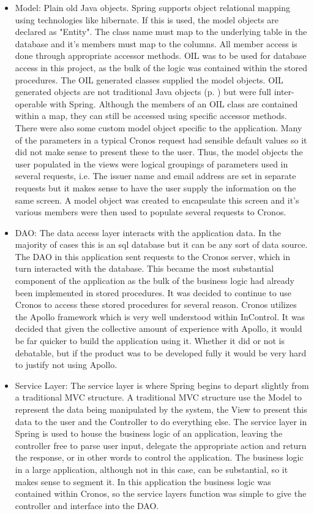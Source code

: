 \documentclass[a4paper, 11pt, titlepage]{article}
\begin{document}
\begin{itemize}
\item Model: Plain old Java objects. Spring supports object relational mapping using technologies like hibernate. If this is used, the model objects are declared as "Entity". The class name must map to the underlying table in the database and it's members must map to the columns. All member access is done through appropriate accessor methods.
OIL was to be used for database access in this project, as the bulk of the logic was contained within the stored procedures. The OIL generated classes supplied the model objects. OIL generated objects are not traditional Java objects (p. \pageref{metadata}) but were full inter-operable with Spring. Although the members of an OIL class are contained within a map, they can still be accessed using specific accessor methods.
There were also some custom model object specific to the application. Many of the parameters in a typical Cronos request had sensible default values so it did not make sense to present these to the user. Thus, the model objects the user populated in the views were logical groupings of parameters used in several requests, i.e. The issuer name and email address are set in separate requests but it makes sense to have the user supply the information on the same screen. A model object was created to encapsulate this screen and it's various members were then used to populate several requests to Cronos.
\item DAO: The data access layer interacts with the application data. In the majority of cases this is an sql database but it can be any sort of data source. The DAO in this application sent requests to the Cronos server, which in turn interacted with the database. This became the most substantial component of the application as the bulk of the business logic had already been implemented in stored procedures. It was decided to continue to use Cronos to access these stored procedures for several reason. Cronos utilizes the Apollo framework which is very well understood within InControl. It was decided that given the collective amount of experience with Apollo, it would be far quicker to build the application using it. Whether it did or not is debatable, but if the product was to be developed fully it would be very hard to justify not using Apollo.
\item Service Layer: The service layer is where Spring begins to depart slightly from a traditional MVC structure. A traditional MVC structure use the Model to represent the data being manipulated by the system, the View to present this data to the user and the Controller to do everything else. The service layer in Spring is used to house the business logic of an application, leaving the controller free to parse user input, delegate the appropriate action and return the response, or in other words to control the application. The business logic in a large application, although not in this case, can be substantial, so it makes sense to segment it. In this application the business logic was contained within Cronos, so the service layers function was simple to give the controller and interface into the DAO.

\end{itemize}
\end{document}

